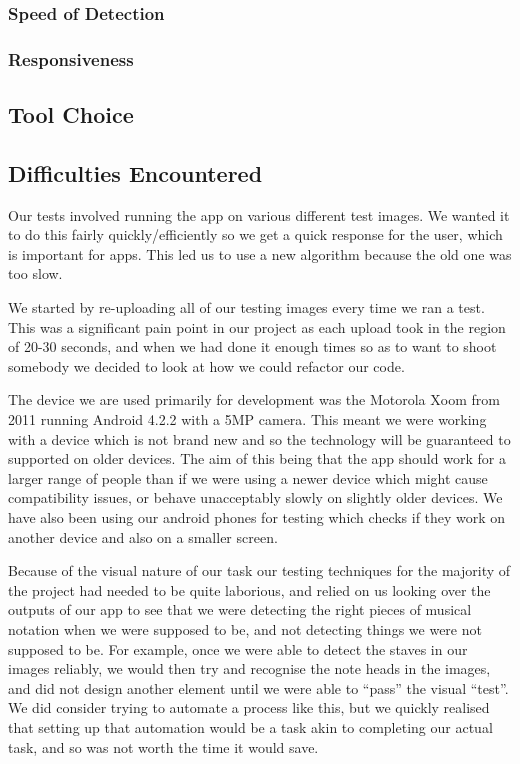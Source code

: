         \subsubsection{Speed of Detection}

        \subsubsection{Responsiveness}
    \subsection{Tool Choice}

    \subsection{Difficulties Encountered}

    
Our tests involved running the app on various different test images. We wanted it to do this fairly quickly/efficiently so we get a quick response for the user, which is important for apps. This led us to use a new algorithm because the old one was too slow.

We started by re-uploading all of our testing images every time we ran a test. This was a significant pain point in our project as each upload took in the region of 20-30 seconds, and when we had done it enough times so as to want to shoot somebody we decided to look at how we could refactor our code.

The device we are used primarily for development was the Motorola Xoom from 2011 running Android 4.2.2 with a 5MP camera. This meant we were working with a device which is not brand new and so the technology will be guaranteed to supported on older devices. The aim of this being that the app should work for a larger range of people than if we were using a newer device which might cause compatibility issues, or behave unacceptably slowly on slightly older devices. We have also
been using our android phones for testing which checks if they work on another device and also on a smaller screen.

Because of the visual nature of our task our testing techniques for the majority of the project had needed to be quite laborious, and relied on us looking over the outputs of our app to see that we were detecting the right pieces of musical notation when we were supposed to be, and not detecting things we were not supposed to be. For example, once we were able to detect the staves in our images reliably, we would then try and recognise the note heads in the images, and did not design
another element until we were able to “pass” the visual “test”. We did consider trying to automate a process like this, but we quickly realised that setting up that automation would be a task akin to completing our actual task, and so was not worth the time it would save.


